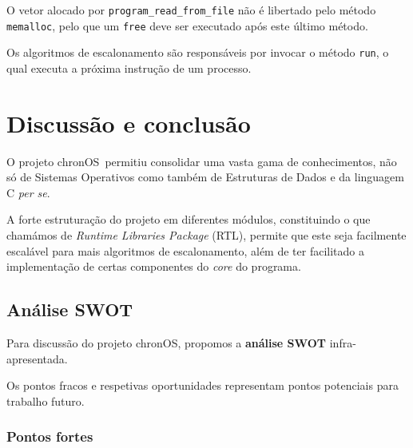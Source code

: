 \documentclass[10pt,oneside]{estiloUBI}
\newcommand{\chronOS}{\textsf{chronOS}}
\begin{document}
	O vetor alocado por \verb|program_read_from_file| não é libertado pelo método \verb|memalloc|, pelo que um \verb|free| deve ser executado após este último método.
	
	Os algoritmos de escalonamento são responsáveis por invocar o método \verb|run|, o qual executa a próxima instrução de um processo.
	
	
	\chapter{Discussão e conclusão}
	\label{sec:con_futwork}
	
	O projeto \chronOS~permitiu consolidar uma vasta gama de conhecimentos, não só de Sistemas Operativos como também de Estruturas de Dados e da linguagem C \textit{per se}.
	
	A forte estruturação do projeto em diferentes módulos, constituindo o que chamámos de \textit{Runtime Libraries Package} (RTL), permite que este seja facilmente escalável para mais algoritmos de escalonamento, além de ter facilitado a implementação de certas componentes do \textit{core} do programa.
	
	
	\section{Análise SWOT}
	
	Para discussão do projeto \chronOS, propomos a \textbf{análise SWOT} infra-apresentada.
	
	Os pontos fracos e respetivas oportunidades representam pontos potenciais para trabalho futuro.
	
	\subsection{Pontos fortes}
	
\end{document}
